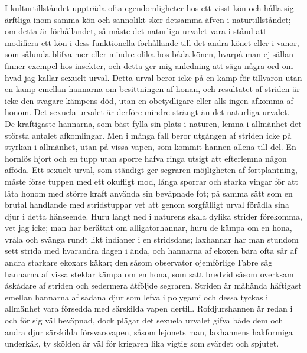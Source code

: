 I kulturtillståndet uppträda ofta egendomligheter hos ett visst kön och hålla sig ärftliga inom samma kön och sannolikt sker detsamma äfven i naturtillståndet; om detta är förhållandet, så måste det naturliga urvalet vara i stånd att modifiera ett kön i dess funktionella förhållande till det andra könet eller i vanor, som sålunda blifva mer eller mindre olika hos båda könen, hvarpå man ej sällan finner exempel hos insekter, och detta ger mig anledning att säga några ord om hvad jag kallar sexuelt urval. Detta urval beror icke på en kamp för tillvaron utan en kamp emellan hannarna om besittningen af honan, och resultatet af striden är icke den svagare kämpens död, utan en obetydligare eller alls ingen afkomma af honom. Det sexuela urvalet är derföre mindre strängt än det naturliga urvalet. De kraftigaste hannarna, som bäst fylla sin plats i naturen, lemna i allmänhet det största antalet afkomlingar. Men i många fall beror utgången af striden icke på styrkan i allmänhet, utan på vissa vapen, som kommit hannen allena till del. En hornlös hjort och en tupp utan sporre hafva ringa utsigt att efterlemna någon afföda. Ett sexuelt urval, som ständigt ger segraren möjligheten af fortplantning, måste förse tuppen med ett okufligt mod, långa sporrar och starka vingar för att låta honom med större kraft använda sin beväpnade fot; på samma sätt som en brutal handlande med stridstuppar vet att genom sorgfälligt urval förädla sina djur i detta hänseende. Huru långt ned i naturens skala dylika strider förekomma, vet jag icke; man har berättat om alligatorhannar, huru de kämpa om en hona, vråla och svänga rundt likt indianer i en stridsdans; laxhannar har man stundom sett strida med hvarandra dagen i ända, och hannarna af ekoxen bära ofta sår af andra starkare ekoxars käkar; den såsom observator ojemförlige Fabre såg hannarna af vissa steklar kämpa om en hona, som satt bredvid såsom overksam åskådare af striden och sedermera åtföljde segraren. Striden är måhända häftigast emellan hannarna af sådana djur som lefva i polygami och dessa tyckas i allmänhet vara försedda med särskilda vapen dertill. Rofdjurshannen är redan i och för sig väl beväpnad, dock plägar det sexuela urvalet gifva både dem och andra djur särskilda försvarsvapen, såsom lejonets man, laxhannens hakformiga underkäk, ty skölden är väl för krigaren lika vigtig som svärdet och spjutet.

